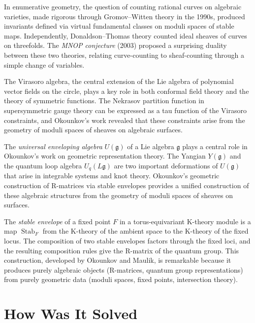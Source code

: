 In enumerative geometry, the question of counting rational curves on algebraic varieties, made rigorous through Gromov--Witten theory in the 1990s, produced invariants defined via virtual fundamental classes on moduli spaces of stable maps. Independently, Donaldson--Thomas theory counted ideal sheaves of curves on threefolds. The \emph{MNOP conjecture} (2003) proposed a surprising duality between these two theories, relating curve-counting to sheaf-counting through a simple change of variables.

The Virasoro algebra, the central extension of the Lie algebra of polynomial vector fields on the circle, plays a key role in both conformal field theory and the theory of symmetric functions. The Nekrasov partition function in supersymmetric gauge theory can be expressed as a tau function of the Virasoro constraints, and Okounkov's work revealed that these constraints arise from the geometry of moduli spaces of sheaves on algebraic surfaces.

The \emph{universal enveloping algebra} $U(\mathfrak{g})$ of a Lie algebra $\mathfrak{g}$ plays a central role in Okounkov's work on geometric representation theory. The Yangian $Y(\mathfrak{g})$ and the quantum loop algebra $U_q(L\mathfrak{g})$ are two important deformations of $U(\mathfrak{g})$ that arise in integrable systems and knot theory. Okounkov's geometric construction of R-matrices via stable envelopes provides a unified construction of these algebraic structures from the geometry of moduli spaces of sheaves on surfaces.

The \emph{stable envelope} of a fixed point $F$ in a torus-equivariant K-theory module is a map $\operatorname{Stab}_F$ from the K-theory of the ambient space to the K-theory of the fixed locus. The composition of two stable envelopes factors through the fixed loci, and the resulting composition rules give the R-matrix of the quantum group. This construction, developed by Okounkov and Maulik, is remarkable because it produces purely algebraic objects (R-matrices, quantum group representations) from purely geometric data (moduli spaces, fixed points, intersection theory).

\section{How Was It Solved}

